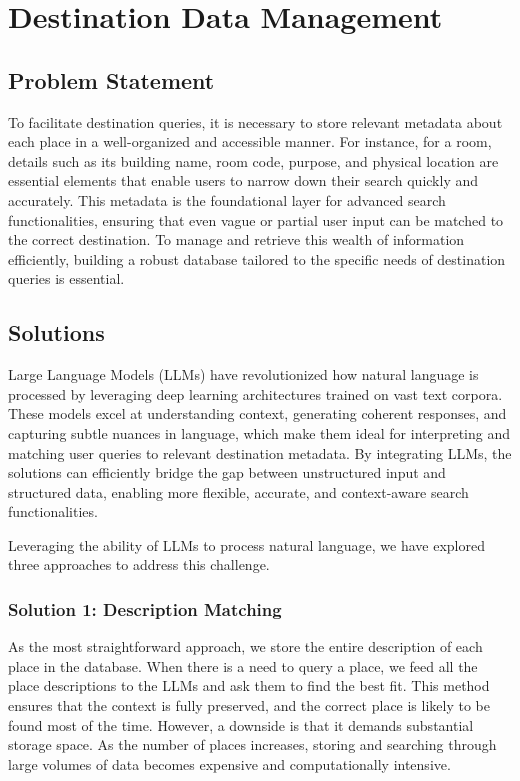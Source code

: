 \section{Destination Data Management}\label{sec:DestinationDataManagement}
\subsection{Problem Statement}
To facilitate destination queries, it is necessary to store relevant metadata about each place in a well-organized and accessible manner. For instance, for a room, details such as its building name, room code, purpose, and physical location are essential elements that enable users to narrow down their search quickly and accurately. This metadata is the foundational layer for advanced search functionalities, ensuring that even vague or partial user input can be matched to the correct destination. To manage and retrieve this wealth of information efficiently, building a robust database tailored to the specific needs of destination queries is essential.

\subsection{Solutions}
Large Language Models (LLMs) have revolutionized how natural language is processed by leveraging deep learning architectures trained on vast text corpora. These models excel at understanding context, generating coherent responses, and capturing subtle nuances in language, which make them ideal for interpreting and matching user queries to relevant destination metadata. By integrating LLMs, the solutions can efficiently bridge the gap between unstructured input and structured data, enabling more flexible, accurate, and context-aware search functionalities.

Leveraging the ability of LLMs to process natural language, we have explored three approaches to address this challenge.

\subsubsection{Solution 1: Description Matching}\label{description-matching}
As the most straightforward approach, we store the entire description of each place in the database. When there is a need to query a place, we feed all the place descriptions to the LLMs and ask them to find the best fit. This method ensures that the context is fully preserved, and the correct place is likely to be found most of the time. However, a downside is that it demands substantial storage space. As the number of places increases, storing and searching through large volumes of data becomes expensive and computationally intensive.

